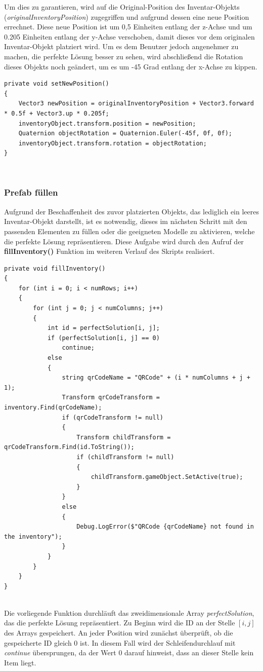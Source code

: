 Um dies zu garantieren, wird auf die Original-Position des Inventar-Objekts
(\textit{originalInventoryPosition}) zugegriffen und aufgrund dessen eine neue Position errechnet. Diese neue Position ist
um 0,5 Einheiten entlang der z-Achse und um 0.205 Einheiten entlang der y-Achse verschoben, damit dieses vor dem originalen
Inventar-Objekt platziert wird. Um es dem Benutzer jedoch angenehmer zu machen, die perfekte Lösung besser zu sehen, wird
abschließend die Rotation dieses Objekts noch geändert, um es um -45 Grad entlang der x-Achse zu kippen.
\begin{lstlisting}[style=csharp, caption={Neue Position setzen}, label=code:newPos_PSV]
private void setNewPosition()
{
    Vector3 newPosition = originalInventoryPosition + Vector3.forward * 0.5f + Vector3.up * 0.205f;
    inventoryObject.transform.position = newPosition;
    Quaternion objectRotation = Quaternion.Euler(-45f, 0f, 0f);
    inventoryObject.transform.rotation = objectRotation;
}
\end{lstlisting}\\

\subsubsection{Prefab füllen}
Aufgrund der Beschaffenheit des zuvor platzierten Objekts, das lediglich ein leeres Inventar-Objekt darstellt, ist es
notwendig, dieses im nächsten Schritt mit den passenden Elementen zu füllen oder die geeigneten Modelle zu aktivieren,
welche die perfekte Lösung repräsentieren. Diese Aufgabe wird durch den Aufruf der \textbf{fillInventory()} Funktion im
weiteren Verlauf des Skripts realisiert.
\begin{lstlisting}[style=csharp, caption={Inventar füllen}, label=code:invFül_PSV]
private void fillInventory()
{
    for (int i = 0; i < numRows; i++)
    {
        for (int j = 0; j < numColumns; j++)
        {
            int id = perfectSolution[i, j];
            if (perfectSolution[i, j] == 0)
                continue;
            else
            {
                string qrCodeName = "QRCode" + (i * numColumns + j + 1);
                Transform qrCodeTransform = inventory.Find(qrCodeName);
                if (qrCodeTransform != null)
                {
                    Transform childTransform = qrCodeTransform.Find(id.ToString());
                    if (childTransform != null)
                    {
                        childTransform.gameObject.SetActive(true);
                    }
                }
                else
                {
                    Debug.LogError($"QRCode {qrCodeName} not found in the inventory");
                }
            }
        }
    }
}
\end{lstlisting}\\
Die vorliegende Funktion durchläuft das zweidimensionale Array \textit{perfectSolution}, das die perfekte Lösung repräsentiert.
Zu Beginn wird die ID an der Stelle $[i, j]$ des Arrays gespeichert. An jeder Position wird zunächst überprüft, ob die
gespeicherte ID gleich 0 ist. In diesem Fall wird der Schleifendurchlauf mit \textit{continue} übersprungen, da der Wert
0 darauf hinweist, dass an dieser Stelle kein Item liegt.

